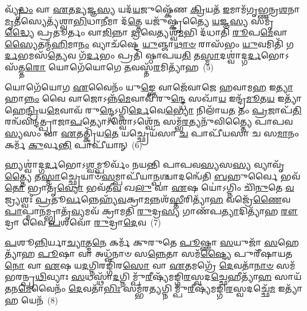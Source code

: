 {\anuvakamend[{\-\ul{𑌕𑌾}\-𑌮𑌯𑍇᳴𑌤 𑌗𑌾\-\ul{𑌯}\-𑌤𑍍𑌰𑍋॑\-𑌽\-\ul{𑌰𑍍𑌧}\-𑌯𑍇𑌤𑌿᳴ 𑌚 \ul{𑌸}\-𑌪𑍍𑌤𑌵𑌿𑍞᳴𑌶𑌤𑌿𑌶𑍍𑌚}]}%

𑌵𑍍𑌯𑍃᳴\-\ul{𑌦𑍍𑌧𑌂} 𑌵𑌾 \ul{𑌏}\-𑌤\-\ul{𑌦𑍍𑌯}\-𑌜𑍍𑌞\-\ul{𑌸𑍍𑌯} 𑌯𑌦᳴\-\ul{𑌯}\-𑌜𑍁𑌷𑍍𑌕𑍇᳴𑌣 \ul{𑌕𑍍𑌰𑌿}\-𑌯𑌤᳴ \ul{𑌇}\-𑌮𑌾𑌮᳴𑌗𑍃𑌭𑍍𑌣𑌨𑍍𑌰\-\ul{𑌶}\-𑌨𑌾\-\ul{𑌮𑍃}\-𑌤𑌸𑍍𑌯𑍇𑌤𑍍𑌯᳴𑌶𑍍𑌵𑌾\-\ul{𑌭𑌿}\-𑌧𑌾\-\ul{𑌨𑍀}\-𑌮𑌾 𑌦᳴\-\ul{𑌤𑍍𑌤𑍇} 𑌯𑌜𑍁᳴𑌷𑍍𑌕𑍃𑌤𑍍𑌯𑍈 \ul{𑌯}\-𑌜𑍍𑌞\-\ul{𑌸𑍍𑌯} 𑌸𑌮𑍃᳴\-\ul{𑌦𑍍𑌧𑍍𑌯𑍈} 𑌪𑍍𑌰𑌤𑍂॑𑌰𑍍𑌤𑌂 𑌵𑌾\-\ul{𑌜𑌿}\-𑌨𑍍𑌨𑌾 \ul{𑌦𑍍𑌰}\-𑌵𑍇𑌤𑍍𑌯𑌶𑍍𑌵᳴\-\ul{𑌮}\-𑌭𑌿 𑌦᳴𑌧𑌾𑌤𑌿 \ul{𑌰𑍂}\-𑌪\-\ul{𑌮𑍇}\-𑌵𑌾\-\ul{𑌸𑍍𑌯𑍈}\-𑌤𑌨𑍍𑌮᳴\-\ul{𑌹𑌿}\-𑌮𑌾\-\ul{𑌨𑌂} 𑌵𑍍𑌯𑌾𑌚᳴𑌷𑍍𑌟𑍇 \ul{𑌯𑍁}\-𑌞𑍍𑌜𑌾\-\ul{𑌥𑌾}\-\-\ul{𑍞} 𑌰𑌾𑌸᳴𑌭𑌂 \ul{𑌯𑍁}\-𑌵𑌮𑌿𑌤𑌿᳴ 𑌗\-\ul{𑌰𑍍𑌦}\-𑌭𑌮𑌸᳴\-\ul{𑌤𑍍𑌯𑍇}\-𑌵 𑌗᳴\-\ul{𑌰𑍍𑌦}\-𑌭𑌂 𑌪𑍍𑌰𑌤𑌿᳴ 𑌷𑍍𑌠𑌾𑌪𑌯\-\ul{𑌤𑌿} 𑌤\-\ul{𑌸𑍍𑌮𑌾}\-𑌦𑌶𑍍𑌵𑌾॑𑌦𑍍𑌗\-\ul{𑌰𑍍𑌦}\-𑌭𑍋\-𑌽𑌸᳴𑌤𑍍𑌤\-\ul{𑌰𑍋} 𑌯𑍋𑌗𑍇᳴𑌯𑍋𑌗𑍇 \ul{𑌤}\-𑌵𑌸𑍍𑌤᳴\-\ul{𑌰}\-𑌮𑌿𑌤𑍍𑌯𑌾᳴𑌹~(5)

𑌯𑍋𑌗𑍇᳴𑌯𑍋𑌗 \ul{𑌏}\-𑌵𑍈𑌨𑌂᳴ 𑌯𑍁\-\ul{𑌙𑍍𑌕𑍍𑌤𑍇} 𑌵𑌾𑌜𑍇᳴𑌵𑌾𑌜𑍇 𑌹𑌵𑌾𑌮\-\ul{𑌹} 𑌇\-\ul{𑌤𑍍𑌯𑌾}\-𑌹𑌾\-\ul{𑌨𑍍𑌨𑌂} 𑌵𑍈 𑌵𑌾𑌜𑍋\-𑌽𑌨𑍍𑌨᳴\-\ul{𑌮𑍇}\-𑌵𑌾𑌵᳴ 𑌰𑍁\-\ul{𑌨𑍍𑌦𑍍𑌧𑍇} 𑌸𑌖𑌾᳴\-\ul{𑌯} 𑌇𑌨𑍍𑌦𑍍𑌰᳴\-\ul{𑌮𑍂}\-𑌤\-\ul{𑌯} 𑌇𑌤𑍍𑌯𑌾᳴𑌹𑍇\-\ul{𑌨𑍍𑌦𑍍𑌰𑌿}\-𑌯\-\ul{𑌮𑍇}\-𑌵𑌾𑌵᳴ 𑌰𑍁\-\ul{𑌨𑍍𑌦𑍍𑌧𑍇}\-\-𑌽𑌗𑍍𑌨𑌿\-\ul{𑌰𑍍𑌦𑍇}\-𑌵𑍇\-\ul{𑌭𑍍𑌯𑍋} 𑌨𑌿𑌲𑌾᳴𑌯\-\ul{𑌤} 𑌤𑌂 \ul{𑌪𑍍𑌰}\-𑌜𑌾𑌪᳴\-\ul{𑌤𑌿}\-𑌰𑌨𑍍𑌵᳴𑌵𑌿𑌨𑍍𑌦𑌤𑍍𑌪𑍍𑌰𑌾𑌜𑌾\-\ul{𑌪}\-𑌤𑍍𑌯𑍋\-𑌽𑌶𑍍𑌵𑍋\-𑌽𑌶𑍍𑌵𑍇᳴\-\ul{𑌨} 𑌸𑌮𑍍𑌭᳴\-\ul{𑌰}\-𑌤𑍍𑌯𑌨𑍁᳴𑌵𑌿𑌤𑍍𑌤𑍍𑌯𑍈 𑌪𑌾𑌪𑌵\-\ul{𑌸𑍍𑌯}\-𑌸𑌂 𑌵𑌾 \ul{𑌏}\-𑌤𑌤𑍍𑌕𑍍𑌰𑌿᳴𑌯\-\ul{𑌤𑍇} 𑌯𑌚𑍍𑌛𑍍𑌰𑍇𑌯᳴𑌸𑌾 \ul{𑌚} 𑌪𑌾𑌪𑍀᳴𑌯𑌸𑌾 𑌚 𑌸\-\ul{𑌮𑌾}\-𑌨𑌂 𑌕𑌰𑍍𑌮᳴ \ul{𑌕𑍁}\-𑌰𑍍𑌵\-\ul{𑌨𑍍𑌤𑌿} 𑌪𑌾𑌪𑍀᳴𑌯𑌾𑌨𑍍~(6)

𑌹𑍍𑌯𑌶𑍍𑌵𑌾॑𑌦𑍍𑌗\-\ul{𑌰𑍍𑌦}\-𑌭𑍋\-𑌽\-\ul{𑌶𑍍𑌵}\-𑌮𑍍𑌪𑍂𑌰𑍍𑌵𑌂᳴ 𑌨𑌯𑌨𑍍𑌤𑌿 𑌪𑌾𑌪𑌵\-\ul{𑌸𑍍𑌯}\-𑌸\-\ul{𑌸𑍍𑌯} 𑌵𑍍𑌯𑌾𑌵𑍃᳴\-\ul{𑌤𑍍𑌤𑍍𑌯𑍈} 𑌤\-\ul{𑌸𑍍𑌮𑌾}\-𑌚𑍍𑌛𑍍𑌰𑍇𑌯𑌾𑍞᳴\-\ul{𑌸}\-𑌮𑍍𑌪𑌾𑌪𑍀᳴𑌯𑌾\-\ul{𑌨𑍍𑌪}\-𑌶𑍍𑌚𑌾𑌦𑌨𑍍𑌵𑍇᳴𑌤𑌿 \ul{𑌬}\-𑌹𑍁𑌰𑍍𑌵𑍈 𑌭𑌵᳴\-\ul{𑌤𑍋} 𑌭𑍍𑌰𑌾𑌤𑍃᳴\-\ul{𑌵𑍍𑌯𑍋} 𑌭𑌵᳴𑌤𑍀\-\ul{𑌵} 𑌖\-\ul{𑌲𑍁} 𑌵𑌾 \ul{𑌏}\-𑌷 𑌯𑍋॑\-𑌽𑌗𑍍𑌨𑌿𑌂 𑌚𑌿᳴\-\ul{𑌨𑍁}\-𑌤𑍇 \ul{𑌵}\-𑌜𑍍𑌰𑍍𑌯𑌶𑍍𑌵𑌃᳴ \ul{𑌪𑍍𑌰}\-𑌤𑍂\-\ul{𑌰𑍍𑌵}\-𑌨𑍍𑌨𑍇𑌹𑍍𑌯᳴\-\ul{𑌵}\-𑌕𑍍𑌰𑌾\-\ul{𑌮}\-𑌨𑍍𑌨𑌶᳴\-\ul{𑌸𑍍𑌤𑍀}\-𑌰𑌿𑌤𑍍𑌯𑌾᳴\-\ul{𑌹} 𑌵𑌜𑍍𑌰𑍇᳴\-\ul{𑌣𑍈}\-𑌵 \ul{𑌪𑌾}\-𑌪𑍍𑌮𑌾\-\ul{𑌨}\-𑌮𑍍𑌭𑍍𑌰𑌾𑌤𑍃᳴\-\ul{𑌵𑍍𑌯}\-𑌮𑌵᳴ 𑌕𑍍𑌰𑌾𑌮𑌤𑌿 \ul{𑌰𑍁}\-𑌦𑍍𑌰\-\ul{𑌸𑍍𑌯} 𑌗𑌾𑌣᳴𑌪\-\ul{𑌤𑍍𑌯𑌾}\-𑌦𑌿𑌤𑍍𑌯𑌾᳴𑌹 \ul{𑌰𑍗}\-𑌦𑍍𑌰𑌾 𑌵𑍈 \ul{𑌪}\-𑌶𑌵𑍋᳴ \ul{𑌰𑍁}\-𑌦𑍍𑌰𑌾\-\ul{𑌦𑍇}\-𑌵~(7)

\-\ul{𑌪}\-𑌶𑍂\-\ul{𑌨𑍍𑌨𑌿}\-𑌰𑍍𑌯𑌾\-\ul{𑌚𑍍𑌯𑌾}\-𑌤𑍍𑌮\-\ul{𑌨𑍇} 𑌕𑌰𑍍𑌮᳴ 𑌕𑍁𑌰𑍁𑌤𑍇 \ul{𑌪𑍂}\-𑌷𑍍𑌣𑌾 \ul{𑌸}\-𑌯𑍁𑌜𑌾᳴ \ul{𑌸}\-𑌹𑍇𑌤𑍍𑌯𑌾᳴𑌹 \ul{𑌪𑍂}\-𑌷𑌾 𑌵𑌾 𑌅𑌧𑍍𑌵᳴𑌨𑌾𑍞 𑌸\-\ul{𑌨𑍍𑌨𑍇}\-𑌤𑌾 𑌸𑌮᳴\-\ul{𑌷𑍍𑌟𑍍𑌯𑍈} 𑌪𑍁𑌰𑍀᳴𑌷𑌾𑌯𑌤\-\ul{𑌨𑍋} 𑌵𑌾 \ul{𑌏}\-𑌷 𑌯\-\ul{𑌦}\-𑌗𑍍𑌨𑌿𑌰𑌙𑍍𑌗𑌿᳴𑌰\-\ul{𑌸𑍋} 𑌵𑌾 \ul{𑌏}\-𑌤𑌮𑌗𑍍𑌰𑍇᳴ \ul{𑌦𑍇}\-𑌵𑌤𑌾᳴\-\ul{𑌨𑌾}\-\-\ul{𑍞} 𑌸𑌮᳴𑌭𑌰𑌨𑍍𑌪𑍃\-\ul{𑌥𑌿}\-𑌵𑍍𑌯𑌾𑌃 \ul{𑌸}\-𑌧𑌸𑍍𑌥𑌾᳴\-\ul{𑌦}\-𑌗𑍍𑌨𑌿𑌮𑍍𑌪𑍁᳴\-\ul{𑌰𑍀}\-𑌷𑍍𑌯᳴𑌮𑌙𑍍𑌗𑌿\-\ul{𑌰}\-𑌸𑍍𑌵𑌦\-\ul{𑌚𑍍𑌛𑍇}\-𑌹𑍀𑌤𑍍𑌯𑌾᳴\-\ul{𑌹} 𑌸𑌾𑌯᳴𑌤𑌨\-\ul{𑌮𑍇}\-𑌵𑍈𑌨𑌂᳴ \ul{𑌦𑍇}\-𑌵𑌤𑌾᳴\-\ul{𑌭𑌿𑌃} 𑌸𑌮𑍍𑌭᳴𑌰\-\ul{𑌤𑍍𑌯}\-𑌗𑍍𑌨𑌿𑌮𑍍𑌪𑍁᳴\-\ul{𑌰𑍀}\-𑌷𑍍𑌯᳴𑌮𑌙𑍍𑌗𑌿\-\ul{𑌰}\-𑌸𑍍𑌵𑌦𑌚𑍍𑌛𑍇᳴\-\ul{𑌮} 𑌇𑌤𑍍𑌯𑌾᳴𑌹 𑌯𑍇𑌨᳴~(8)


